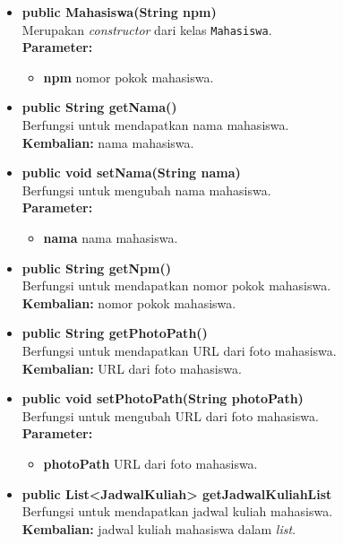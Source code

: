 \begin{itemize}
	\item \textbf{public Mahasiswa(String npm)}\\
	Merupakan \textit{constructor} dari kelas \texttt{Mahasiswa}.\\
	\textbf{Parameter:}
	\begin{itemize}
		\item \textbf{npm} nomor pokok mahasiswa.
	\end{itemize}
	
	\item \textbf{public String getNama()}\\
		Berfungsi untuk mendapatkan nama mahasiswa.\\
		\textbf{Kembalian:} nama mahasiswa.

	\item \textbf{public void setNama(String nama)}\\
		Berfungsi untuk mengubah nama mahasiswa.\\
		\textbf{Parameter:}
		\begin{itemize}
			\item \textbf{nama} nama mahasiswa.
		\end{itemize}

	\item \textbf{public String getNpm()}\\
		Berfungsi untuk mendapatkan nomor pokok mahasiswa.\\
		\textbf{Kembalian:} nomor pokok mahasiswa.
	
	\item \textbf{public String getPhotoPath()}\\
		Berfungsi untuk mendapatkan URL dari foto mahasiswa.\\
		\textbf{Kembalian:} URL dari foto mahasiswa.
	
	\item \textbf{public void setPhotoPath(String photoPath)}\\
		Berfungsi untuk mengubah URL dari foto mahasiswa.\\
        \textbf{Parameter:}
		\begin{itemize}
			\item \textbf{photoPath} URL dari foto mahasiswa.
		\end{itemize}	
		
	\item \textbf{public List<JadwalKuliah> getJadwalKuliahList}\\
		Berfungsi untuk mendapatkan jadwal kuliah mahasiswa.\\
		\textbf{Kembalian:} jadwal kuliah mahasiswa dalam \textit{list}.
	

\end{itemize}
